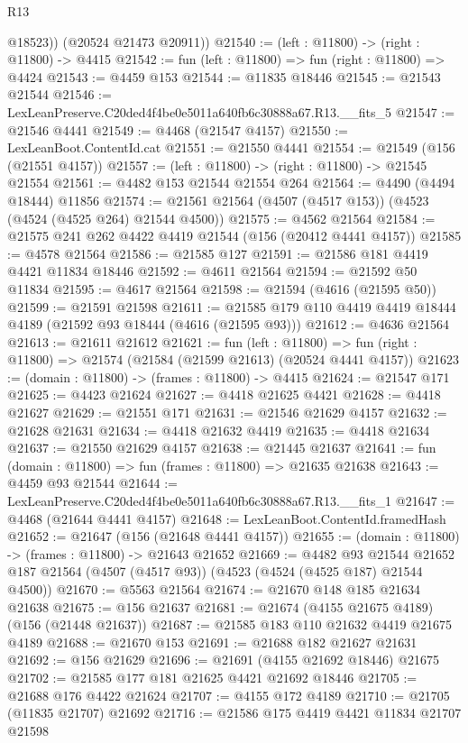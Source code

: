 \begin{lexlean}{R13}
\begin{coremodule}
          @18523))
      (@20524 @21473 @20911))
@21540 := (left : @11800) -> (right : @11800) -> @4415
@21542 := fun (left : @11800) => fun (right : @11800) => @4424
@21543 := @4459 @153
@21544 := @11835 @18446
@21545 := @21543 @21544
@21546 := LexLeanPreserve.C20ded4f4be0e5011a640fb6c30888a67.R13.__fits_5
@21547 := @21546 @4441
@21549 := @4468 (@21547 @4157)
@21550 := LexLeanBoot.ContentId.cat
@21551 := @21550 @4441
@21554 := @21549 (@156 (@21551 @4157))
@21557 := (left : @11800) -> (right : @11800) -> @21545 @21554
@21561 := @4482 @153 @21544 @21554 @264
@21564 := @4490 (@4494 @18444) @11856
@21574 := @21561 @21564 (@4507 (@4517 @153)) (@4523 (@4524 (@4525 @264) @21544 @4500))
@21575 := @4562 @21564
@21584 := @21575 @241 @262 @4422 @4419 @21544 (@156 (@20412 @4441 @4157))
@21585 := @4578 @21564
@21586 := @21585 @127
@21591 := @21586 @181 @4419 @4421 @11834 @18446
@21592 := @4611 @21564
@21594 := @21592 @50 @11834
@21595 := @4617 @21564
@21598 := @21594 (@4616 (@21595 @50))
@21599 := @21591 @21598
@21611 := @21585 @179 @110 @4419 @4419 @18444 @4189 (@21592 @93 @18444 (@4616 (@21595 @93)))
@21612 := @4636 @21564
@21613 := @21611 @21612
@21621 := fun (left : @11800) =>
  fun (right : @11800) => @21574 (@21584 (@21599 @21613) (@20524 @4441 @4157))
@21623 := (domain : @11800) -> (frames : @11800) -> @4415
@21624 := @21547 @171
@21625 := @4423 @21624
@21627 := @4418 @21625 @4421
@21628 := @4418 @21627
@21629 := @21551 @171
@21631 := @21546 @21629 @4157
@21632 := @21628 @21631
@21634 := @4418 @21632 @4419
@21635 := @4418 @21634
@21637 := @21550 @21629 @4157
@21638 := @21445 @21637
@21641 := fun (domain : @11800) => fun (frames : @11800) => @21635 @21638
@21643 := @4459 @93 @21544
@21644 := LexLeanPreserve.C20ded4f4be0e5011a640fb6c30888a67.R13.__fits_1
@21647 := @4468 (@21644 @4441 @4157)
@21648 := LexLeanBoot.ContentId.framedHash
@21652 := @21647 (@156 (@21648 @4441 @4157))
@21655 := (domain : @11800) -> (frames : @11800) -> @21643 @21652
@21669 := @4482
    @93
    @21544
    @21652
    @187
    @21564
    (@4507 (@4517 @93))
    (@4523 (@4524 (@4525 @187) @21544 @4500))
@21670 := @5563 @21564
@21674 := @21670 @148 @185 @21634 @21638
@21675 := @156 @21637
@21681 := @21674 (@4155 @21675 @4189) (@156 (@21448 @21637))
@21687 := @21585 @183 @110 @21632 @4419 @21675 @4189
@21688 := @21670 @153
@21691 := @21688 @182 @21627 @21631
@21692 := @156 @21629
@21696 := @21691 (@4155 @21692 @18446) @21675
@21702 := @21585 @177 @181 @21625 @4421 @21692 @18446
@21705 := @21688 @176 @4422 @21624
@21707 := @4155 @172 @4189
@21710 := @21705 (@11835 @21707) @21692
@21716 := @21586 @175 @4419 @4421 @11834 @21707 @21598

\end{coremodule}
\end{lexlean}
